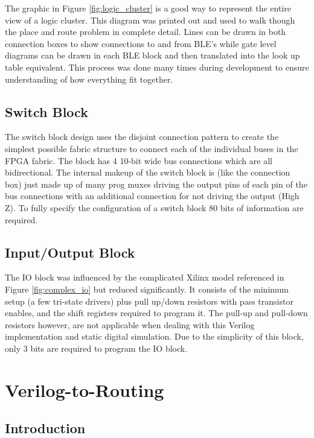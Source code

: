 \documentclass[12pt]{article}
\begin{document}
The graphic in Figure \ref{fig:logic_cluster} is a good way to represent the entire view
of a logic cluster. This diagram was printed out and used to walk though the place and route problem in
complete detail. Lines can be drawn in both connection boxes to show connections to and from BLE's while
gate level diagrams can be drawn in each BLE block and then translated into the look up table
equivalent. This process was done many times during development to ensure understanding of
how everything fit together.

\subsection{Switch Block}

The switch block design uses the disjoint connection pattern to create the simplest
possible fabric structure to connect each of the individual buses in the FPGA fabric.
The block has 4 10-bit wide bus connections which are all
bidirectional. The internal makeup of the switch block is (like the connection box) just
made up of many prog muxes driving the output pins of each pin of the bus connections with
an additional connection for not driving the output (High Z). To fully specify the configuration
of a switch block 80 bits of information are required.


\subsection{Input/Output Block}

The IO block was influenced by the complicated Xilinx model referenced in Figure
\ref{fig:complex_io} but reduced significantly. It consists of the minimum setup 
(a few tri-state drivers) plus pull up/down resistors with pass transistor 
enables, and the shift registers required to program it. The pull-up and pull-down
resistors however, are not applicable when dealing with this Verilog implementation
and static digital simulation. Due to the simplicity of this block, only 3 bits are
required to program the IO block.

\newpage
\section{Verilog-to-Routing} \label{sec:vtr}

\subsection{Introduction}
\end{document}
